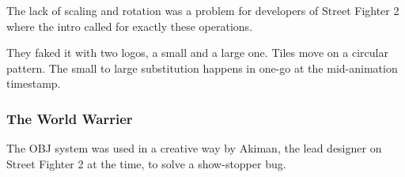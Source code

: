 \begin{minipage}[t]{0.32\linewidth}
\end{minipage}%
\hfill%
\begin{minipage}[t]{0.32\linewidth}
\end{minipage}
\hfill%
\begin{minipage}[t]{0.32\linewidth}
\end{minipage}

\begin{minipage}[t]{0.32\linewidth}
\end{minipage}%
\hfill%
\begin{minipage}[t]{0.32\linewidth}
\end{minipage}
\hfill%
\begin{minipage}[t]{0.32\linewidth}
\end{minipage}

\begin{minipage}[t]{0.32\linewidth}
\end{minipage}%
\hfill%
\begin{minipage}[t]{0.32\linewidth}
\end{minipage}
\hfill%
\begin{minipage}[t]{0.32\linewidth}
\end{minipage}

\begin{minipage}[t]{0.32\linewidth}
\end{minipage}%
\hfill%
\begin{minipage}[t]{0.32\linewidth}
\end{minipage}
\hfill%
\begin{minipage}[t]{0.32\linewidth}
\end{minipage}

The lack of scaling and rotation was a problem for developers of Street Fighter 2 where the intro called for exactly these operations. 

They faked it with two logos, a small and a large one. Tiles move on a circular pattern. The small to large substitution happens in one-go at the mid-animation timestamp.

\pagebreak

\subsubsection{The World Warrier}
The OBJ system was used in a creative way by Akiman, the lead designer on Street Fighter 2 at the time, to solve a show-stopper bug.

